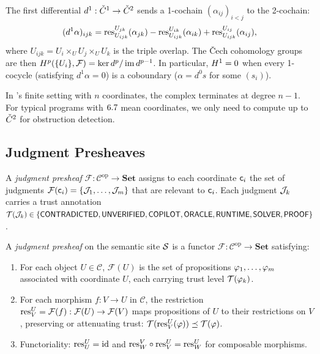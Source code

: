 \documentclass[11pt]{article}
\begin{document}
The first differential $d^1 : \check{C}^1 \to \check{C}^2$ sends a 1-cochain
$(\alpha_{ij})_{i<j}$ to the 2-cochain:
\begin{equation}\label{eq:d1}
  (d^1 \alpha)_{ijk} = \mathrm{res}_{U_{ijk}}^{U_{jk}}(\alpha_{jk})
    - \mathrm{res}_{U_{ijk}}^{U_{ik}}(\alpha_{ik})
    + \mathrm{res}_{U_{ijk}}^{U_{ij}}(\alpha_{ij}),
\end{equation}
where $U_{ijk} = U_i \times_U U_j \times_U U_k$ is the triple overlap.
The \v{C}ech cohomology groups are then
$H^{p}(\{U_i\}, \mathcal{F}) = \ker d^p / \operatorname{im} d^{p-1}$.
In particular, $H^{1} = 0$ when every 1-cocycle (satisfying $d^1\alpha = 0$)
is a coboundary ($\alpha = d^0 s$ for some $(s_i)$).

\begin{remark}
In \JuGeo's finite setting with $n$ coordinates, the complex terminates
at degree $n-1$.  For typical programs with $6.7$ mean
coordinates, we only need to compute up to $\check{C}^2$ for obstruction
detection.
\end{remark}

\subsection{Judgment Presheaves}\label{sec:judgment-presheaves}

A \emph{judgment presheaf} $\mathcal{F} : \mathcal{C}^{\mathrm{op}} \to
\mathbf{Set}$ assigns to each coordinate $\mathsf{c}_i$ the set of judgments
$\mathcal{F}(\mathsf{c}_i) = \{\mathcal{J}_1, \ldots, \mathcal{J}_m\}$ that are relevant to
$\mathsf{c}_i$.  Each judgment $\mathcal{J}_k$ carries a trust annotation
$\mathcal{T}(\mathcal{J}_k) \in \{\mathsf{CONTRADICTED}, \mathsf{UNVERIFIED}, \mathsf{COPILOT}, \mathsf{ORACLE},
\mathsf{RUNTIME}, \mathsf{SOLVER}, \mathsf{PROOF}\}$.

\begin{definition}\label{def:judgment-presheaf}
A \emph{judgment presheaf} on the semantic site $\mathcal{S}$ is a functor
$\mathcal{F} : \mathcal{C}^{\mathrm{op}} \to \mathbf{Set}$ satisfying:
\begin{enumerate}[noitemsep]
  \item For each object $U \in \mathcal{C}$, $\mathcal{F}(U)$ is the set
        of propositions $\varphi_1, \ldots, \varphi_m$ associated with
        coordinate $U$, each carrying trust level $\mathcal{T}(\varphi_k)$.
  \item For each morphism $f : V \to U$ in $\mathcal{C}$, the restriction
        $\mathrm{res}_V^U = \mathcal{F}(f) : \mathcal{F}(U) \to \mathcal{F}(V)$
        maps propositions of $U$ to their restrictions on $V$, preserving
        or attenuating trust: $\mathcal{T}(\mathrm{res}_V^U(\varphi)) \preceq \mathcal{T}(\varphi)$.
  \item Functoriality: $\mathrm{res}_U^U = \mathrm{id}$ and $\mathrm{res}_W^V \circ
        \mathrm{res}_V^U = \mathrm{res}_W^U$ for composable morphisms.
\end{enumerate}
\end{definition}
\end{document}
